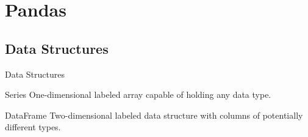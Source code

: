 \documentclass[final, 9pt, svgnames]{beamerPerdy}
\begin{document}
\section{Pandas}
  \subsection{Data Structures}
  \begin{frame}{Data Structures}
    \begin{block}{Series}
      One-dimensional labeled array capable of holding any data type.
    \end{block}

    \begin{block}{DataFrame}
      Two-dimensional labeled data structure with columns of potentially different types.
    \end{block}
  \end{frame}
\end{document}
